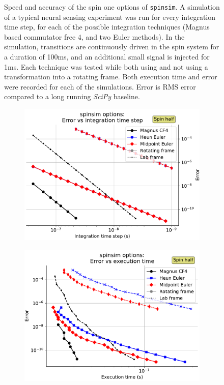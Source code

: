 \documentclass{jors}
\begin{document}
\begin{figure}[h!]
				\caption{Speed and accuracy of the spin one options of \texttt{spinsim}. A simulation of a typical neural sensing experiment was run for every integration time step, for each of the possible integration techniques (Magnus based commutator free 4, and two Euler methods). In the simulation, transitions are continuously driven in the spin system for a duration of 100ms, and an additional small signal is injected for 1ms. Each technique was tested while both using and not using a transformation into a rotating frame. Both execution time and error were recorded for each of the simulations. Error is RMS error compared to a long running \emph{SciPy} baseline.}
				\label{fig:benchmark_spin_one}
			\end{figure}

			\begin{figure}[h!]
				\begin{subfigure}[b]{0.475\textwidth}
					\includegraphics[scale=0.475]{benchmark_spin_half_step_error.pdf}
					\caption{}
					\label{fig:benchmark_spin_half_step_error}
				\end{subfigure}
				\hfill
				\begin{subfigure}[b]{0.475\textwidth}
					\includegraphics[scale=0.475]{benchmark_spin_half_execution_error.pdf}

\end{subfigure}
\end{figure}
\end{document}
